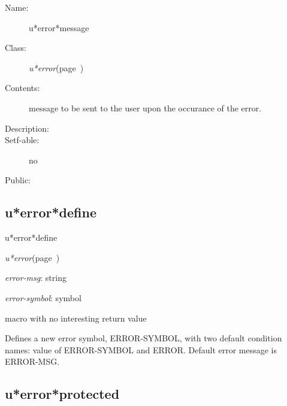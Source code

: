 \begin{description}
\item [Name:]  u*error*message

\item [Class:]
{\sl u*error}\hfill(page~\pageref{u*error})

\item [Contents:] message to be sent to the user upon the 
occurance of the error. 

\item [Description:]

\item [Setf-able:] no

\item [Public:]



\end{description}
\horizontalline

\subsection{u*error*define}
\label{u*error*define}

\begin{description}
\item [Name:]  u*error*define

\item [Class:]
{\sl u*error}\hfill(page~\pageref{u*error})

\item [Parameters:]
\item {\sl error-msg}:  string

\item {\sl error-symbol}:  symbol


\item [Return-value:] 
macro with no interesting return value

\item [Description:]
Defines a new error symbol, ERROR-SYMBOL, with two
default condition names: value of ERROR-SYMBOL and
ERROR. Default error message is ERROR-MSG.

\item [Public:]



\end{description}
\horizontalline

\subsection{u*error*protected}
\label{u*error*protected}

